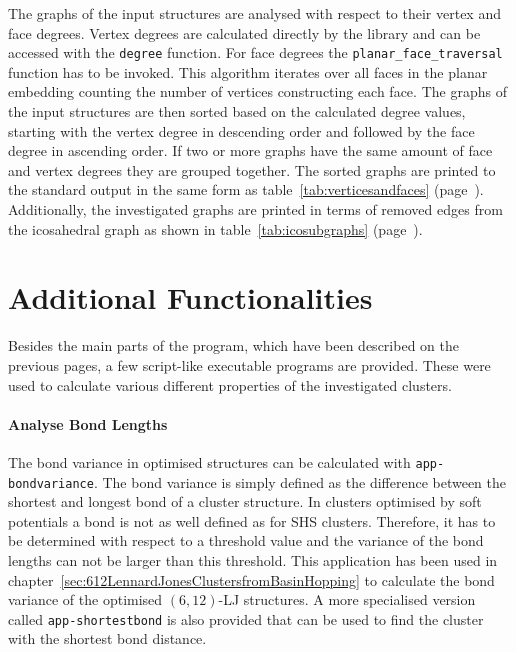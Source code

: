 The graphs of the input structures are analysed with respect to their vertex
and face degrees. Vertex degrees are calculated directly by the library and can
be accessed with the \verb|degree| function. For face degrees the
\verb|planar_face_traversal| function has to be invoked. This algorithm
iterates over all faces in the planar embedding counting the number of vertices
constructing each face. The graphs of the input structures are then sorted
based on the calculated degree values, starting with the vertex degree in
descending order and followed by the face degree in ascending order. If two or
more graphs have the same amount of face and vertex degrees they are grouped
together. The sorted graphs are printed to the standard output in the same form
as table~\ref{tab:verticesandfaces} (page~\pageref{tab:verticesandfaces}).
Additionally, the investigated graphs are printed in terms of removed edges
from the icosahedral graph as shown in table~\ref{tab:icosubgraphs}
(page~\pageref{tab:icosubgraphs}).


\section{Additional Functionalities}
\label{sec:AdditionalFunctions}

Besides the main parts of the program, which have been described on the previous
pages, a few script-like executable programs are provided. These were used to
calculate various different properties of the investigated clusters.

\paragraph{Analyse Bond Lengths}%
The bond variance in optimised structures can be calculated with
\texttt{app-bondvariance}. The bond variance is simply defined as the difference
between the shortest and longest bond of a cluster structure. In clusters
optimised by soft potentials a bond is not as well defined as for \ac{SHS}
clusters. Therefore, it has to be determined with respect to a threshold value
and the variance of the bond lengths can not be larger than this threshold. This
application has been used in
chapter~\ref{sec:612LennardJonesClustersfromBasinHopping} to calculate the bond
variance of the optimised $(6,12)$-\ac{LJ} structures. A more specialised
version called \texttt{app-shortestbond} is also provided that can be used to
find the cluster with the shortest bond distance.


